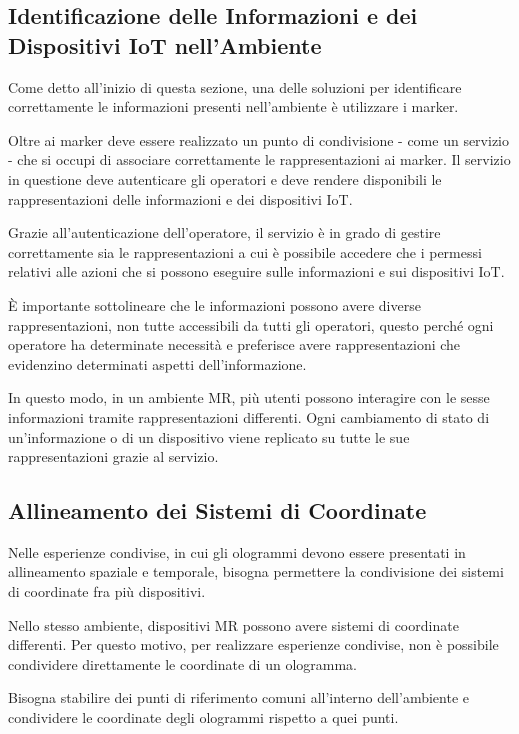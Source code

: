 \subsection{Identificazione delle Informazioni e dei Dispositivi IoT nell'Ambiente}

Come detto all'inizio di questa sezione, una delle soluzioni per identificare correttamente le informazioni presenti nell'ambiente è utilizzare i marker.

Oltre ai marker deve essere realizzato un punto di condivisione - come un servizio - che si occupi di associare correttamente le rappresentazioni ai marker.
Il servizio in questione deve autenticare gli operatori e deve rendere disponibili le rappresentazioni delle informazioni e dei dispositivi IoT.

Grazie all'autenticazione dell'operatore, il servizio è in grado di gestire correttamente sia le rappresentazioni a cui è possibile accedere che i permessi relativi alle azioni che si possono eseguire sulle informazioni e sui dispositivi IoT.

È importante sottolineare che le informazioni possono avere diverse rappresentazioni, non tutte accessibili da tutti gli operatori, questo perché ogni operatore ha determinate necessità e preferisce avere rappresentazioni che evidenzino determinati aspetti dell'informazione.

In questo modo, in un ambiente MR, più utenti possono interagire con le sesse informazioni tramite rappresentazioni differenti. Ogni cambiamento di stato di un'informazione o di un dispositivo viene replicato su tutte le sue rappresentazioni grazie al servizio.

\subsection{Allineamento dei Sistemi di Coordinate}

Nelle esperienze condivise, in cui gli ologrammi devono essere presentati in allineamento spaziale e temporale, bisogna permettere la condivisione dei sistemi di coordinate fra più dispositivi.

Nello stesso ambiente, dispositivi MR possono avere sistemi di coordinate differenti. Per questo motivo, per realizzare esperienze condivise, non è possibile condividere direttamente le coordinate di un ologramma.

Bisogna stabilire dei punti di riferimento comuni all'interno dell'ambiente e condividere le coordinate degli ologrammi rispetto a quei punti.

